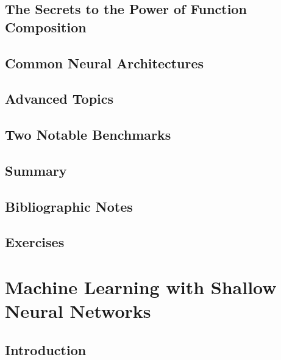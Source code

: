 \documentclass[a4paper]{article}
\begin{document}
\subsection{The Secrets to the Power of Function Composition}

\subsection{Common Neural Architectures}

\subsection{Advanced Topics}

\subsection{Two Notable Benchmarks}

\subsection{Summary}

\subsection{Bibliographic Notes}

\subsection{Exercises}

\newpage
\section{Machine Learning with Shallow Neural Networks}
\subsection{Introduction}
\end{document}
